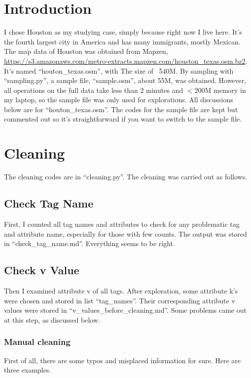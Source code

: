 \documentclass[12pt]{article}
\begin{document}
\maketitle

\section{Introduction}
I chose Houston as my studying case, simply because right now I live here. It's the fourth largest city in America and has many immigrants, mostly Mexican. The map data of Houston was obtained from Mapzen, \url{https://s3.amazonaws.com/metro-extracts.mapzen.com/houston_texas.osm.bz2}. It's named ``houton\_texas.osm'', with The size of ~540M. By sampling with ``sampling.py'', a sample file, ``sample.osm'', about 55M, was obtained. However, all operations on the full data take less than 2 minutes and $<200$M memory in my laptop, so the sample file was only used for explorations. All discussions below are for ``houton\_texas.osm''. The codes for the sample file are kept but commented out so it's straightforward if you want to switch to the sample file.

\section{Cleaning}
The cleaning codes are in ``cleaning.py''. The cleaning was carried out as follows.
\subsection{Check Tag Name}
First, I counted all tag names and attributes to check for any problematic tag and attribute name, especially for those with few counts. The output was stored in ``check\_tag\_name.md''. Everything seems to be right.

\subsection{Check v Value}
Then I examined attribute v of all tags. After exploration, some attribute k's were chosen and stored in list ``tag\_names''. Their corresponding attribute v values were stored in ``v\_values\_before\_cleaning.md''. Some problems came out at this step, as discussed below.

\subsubsection{Manual cleaning}
First of all, there are some typos and misplaced information for sure. Here are three examples.
\end{document}
